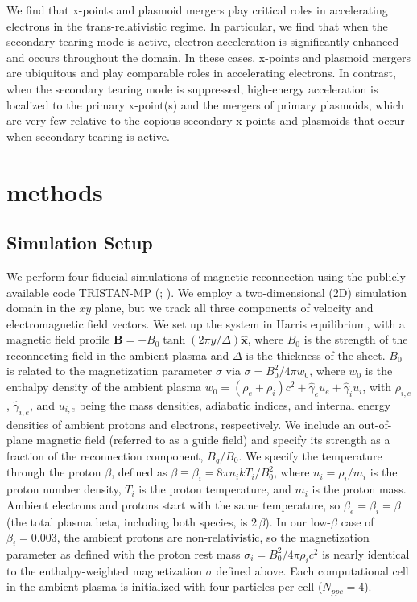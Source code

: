 \documentclass[iop,twocolappendix]{emulateapj}
\begin{document}
We find that x-points and plasmoid mergers play critical roles in accelerating electrons in the trans-relativistic regime.  In particular, we find that when the secondary tearing mode is active, electron acceleration is significantly enhanced and occurs throughout the domain.  In these cases, x-points and plasmoid mergers are ubiquitous  and play comparable roles in accelerating electrons.  In contrast, when the secondary tearing mode is suppressed, high-energy acceleration is localized to the primary x-point(s) and the mergers of primary plasmoids, which are very few relative to the copious secondary x-points and plasmoids that occur when secondary tearing is active.


\section{methods} \label{methods}

\subsection{Simulation Setup} \label{sim_details}
We perform four fiducial simulations of magnetic reconnection using the publicly-available code TRISTAN-MP (\citealt{buneman93}; \citealt{spitkovsky05}).  We employ a two-dimensional (2D) simulation domain in the $xy$ plane, but we track all three components of velocity and electromagnetic field vectors.  We set up the system in Harris equilibrium, with a magnetic field profile $\bm{{B}} = -B_{0}\tanh{\left(2\pi y / \Delta\right)}\bm{\hat{x}}$, where $B_{0}$ is the strength of the reconnecting field in the ambient plasma and $\Delta$ is the thickness of the sheet.  $B_{0}$ is related to the magnetization parameter $\sigma$ via $\sigma=B_{0}^2 / 4\pi w_{0} $, where $w_{0}$ is the enthalpy density of the ambient plasma $w_0=(\rho_{e}+\rho_{i})c^{2}+ \hat{\gamma}_{e}u_{e}+ \hat{\gamma}_{i}u_{i}$, with $\rho_{i,e}$, $\hat{\gamma}_{i,e}$, and $u_{i,e}$ being the mass densities, adiabatic indices, and internal energy densities of ambient protons and electrons, respectively.  We include an out-of-plane magnetic field (referred to as a guide field) and specify its strength as a fraction of the reconnection component, $B_{g}/B_{0}$.  We specify the temperature through the proton $\beta$, defined as $\beta \equiv \beta_{i}=8 \pi n_{i} k T_{i}/B_{0}^{2}$, where $n_i=\rho_i/m_i$ is the proton number density, $T_i$ is the proton temperature, and $m_i$ is the proton mass. Ambient electrons and protons start with the same temperature, so $\beta_e=\beta_i=\beta$ (the total plasma beta, including both species, is $2\,\beta$). In our low-$\beta$ case of $\beta_{i}=0.003$, the ambient protons are non-relativistic, so the magnetization parameter as defined with the proton rest mass $\sigma_i=B_0^2/4\pi \rho_i c^2$ is nearly identical to the enthalpy-weighted magnetization $\sigma$ defined above. Each computational cell in the ambient plasma is initialized with four particles per cell ($N_{ppc}=4$). 
\end{document}
